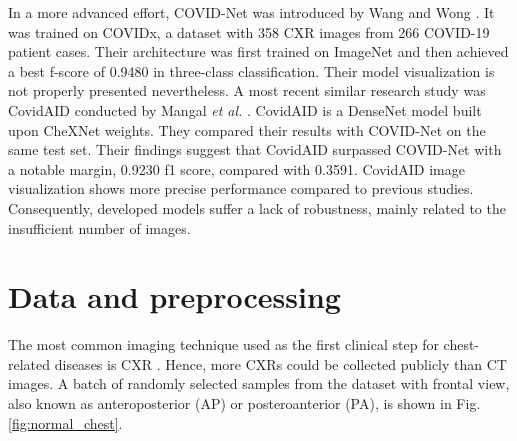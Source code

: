 \documentclass{article}
\begin{document}
In a more advanced effort, COVID-Net was introduced by Wang and Wong \cite{wang2020covid}. It was trained on COVIDx, a dataset with 358 CXR images from 266 COVID-19 patient cases. Their architecture was first trained on ImageNet and then achieved a best f-score of 0.9480 in three-class classification. Their model visualization is not properly presented nevertheless. A most recent similar research study was CovidAID conducted by Mangal \textit{et al.} \cite{mangal2020covidaid}. CovidAID is a DenseNet model built upon CheXNet weights. They compared their results with COVID-Net on the same test set. Their findings suggest that CovidAID surpassed COVID-Net with a notable margin, 0.9230 f1 score, compared with 0.3591. CovidAID image visualization shows more precise performance compared to previous studies. Consequently, developed models suffer a lack of robustness, mainly related to the insufficient number of images.


\section{Data and preprocessing}
The most common imaging technique used as the first clinical step for chest-related diseases is CXR \cite{zompatori2014overview}. Hence, more CXRs could be collected publicly than CT images. A batch of randomly selected samples from the dataset with frontal view, also known as anteroposterior (AP) or posteroanterior (PA), is shown in Fig. \ref{fig:normal_chest}.
\end{document}

